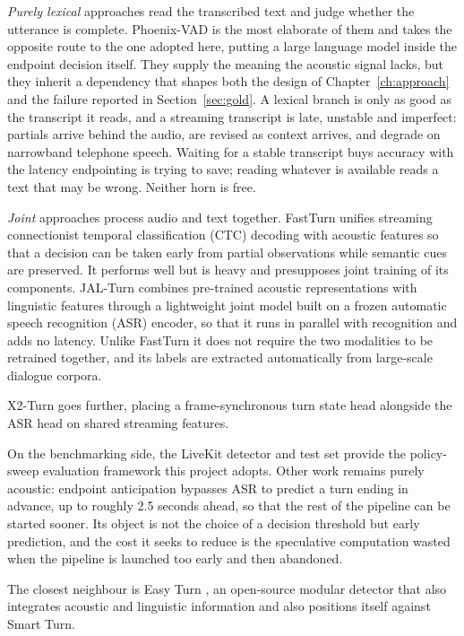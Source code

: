 \emph{Purely lexical} approaches read the transcribed text and judge whether the utterance
is complete. Phoenix-VAD \citep{phoenixvad2025} is the most elaborate of them and takes the
opposite route to the one adopted here, putting a large language model inside the endpoint
decision itself. They supply the meaning the acoustic signal lacks, but they inherit a dependency that shapes
both the design of Chapter~\ref{ch:approach} and the failure reported in
Section~\ref{sec:gold}. A lexical branch is only as good as the transcript it reads, and a
streaming transcript is late, unstable and imperfect: partials arrive behind the audio, are
revised as context arrives, and degrade on narrowband telephone speech. Waiting for a stable
transcript buys accuracy with the latency endpointing is trying to save; reading whatever is
available reads a text that may be wrong. Neither horn is free.

\emph{Joint} approaches process audio and text together. FastTurn \citep{fastturn2026} unifies streaming connectionist temporal classification (CTC)
decoding with acoustic features so that a
decision can be taken early from partial observations while semantic cues are preserved.
It performs well but is heavy and presupposes joint training of its components. JAL-Turn
\citep{jalturn2026} combines pre-trained acoustic representations with linguistic features
through a lightweight joint model built on a frozen automatic speech recognition (ASR)
encoder, so that it runs in
parallel with recognition and adds no latency. Unlike FastTurn it does not require the two
modalities to be retrained together, and its labels are extracted automatically from
large-scale dialogue corpora. 

X2-Turn \citep{x2turn2026} goes further, placing a frame-synchronous turn state head
alongside the ASR head on shared streaming features.

On the benchmarking side, the LiveKit detector and test set provide the policy-sweep
evaluation framework this project adopts. Other work remains purely acoustic: endpoint
anticipation \citep{udupa2026anticipation} bypasses ASR to predict a turn ending in
advance, up to roughly 2.5 seconds ahead, so that the rest of the pipeline can be started
sooner. Its object is not the choice of a decision threshold but early prediction, and the
cost it seeks to reduce is the speculative computation wasted when the pipeline is
launched too early and then abandoned.

The closest neighbour is Easy Turn \citep{easyturn2025}, an open-source modular detector
that also integrates acoustic and linguistic information and also positions itself against
Smart Turn. 


